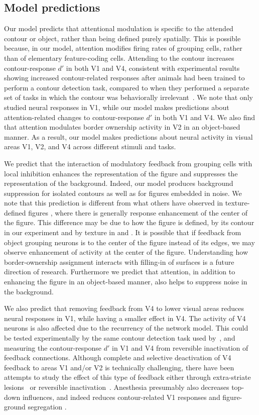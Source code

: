\subsection{Model predictions}
Our model predicts that attentional modulation is specific to the
attended contour or object, rather than being defined purely
spatially. This is possible because, in our model, attention modifies
firing rates of grouping cells, rather than of elementary
feature-coding cells. Attending to the contour increases
contour-response $d'$ in both V1 and V4, consistent with experimental
results showing increased contour-related responses after animals had
been trained to perform a contour detection task, compared to when
they performed a separate set of tasks in which the contour was
behaviorally irrelevant~\citep{Li_etal08a}. We note that
\cite{Li_etal08a} only studied neural responses in V1, while our model
makes predictions about attention-related changes to contour-response
$d'$ in both V1 and V4.  We also find that attention modulates border
ownership activity in V2 in an object-based manner. As a result, our
model makes predictions about neural activity in visual areas V1, V2,
and V4 across different stimuli and tasks.

We predict that the interaction of modulatory feedback from grouping
cells with local inhibition enhances the representation of the figure
and suppresses the representation of the background.  Indeed, our
model produces background suppression for isolated contours as well as
for figures embedded in noise.  We note that this prediction is
different from what others have observed in texture-defined figures
\citep{Lamme95,Lee_etal98a}, where there is generally response
enhancement of the center of the figure.  This difference may be due
to how the figure is defined, by its contour in our experiment and by
texture in \cite{Lamme95} and \cite{Lee_etal98a}.
It is possible that if feedback from object grouping neurons is to the center of the
figure instead of its edges, we may observe enhancement of activity at
the center of the figure. Understanding how border-ownership
assignment interacts with filling-in of surfaces is a future direction
of research.  Furthermore we predict that attention, in addition to
enhancing the figure in an object-based manner, also helps to suppress
noise in the background.

We also predict that removing feedback from V4 to lower visual areas
reduces neural responses in V1, while having a smaller effect in V4.
The activity of V4 neurons is also affected due to the recurrency of
the network model. This could be tested experimentally by the same contour
detection task used by~\cite{Chen_etal14}, and measuring the
contour-response $d'$ in V1 and V4 from reversible inactivation of
feedback connections. Although complete and selective deactivation of
V4 feedback to areas V1 and/or V2 is technically challenging, there
have been attempts to study the effect of this type of feedback either
through extra-striate lesions~\citep{Super_Lamme07} or reversible
inactivation~\citep{Jansen-Amorim_etal12}.  Anesthesia presumably also
decreases top-down influences, and indeed reduces contour-related V1
responses \citep{Li_etal08a} and figure-ground segregation
\citep{Lamme_etal98}.

